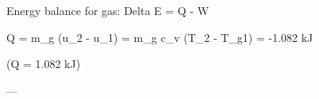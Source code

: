 Energy balance for gas:  
Delta E = Q - W  

Q = m_g (u_2 - u_1) = m_g c_v (T_2 - T_g1) = -1.082 kJ  

(Q = 1.082 kJ)  

---